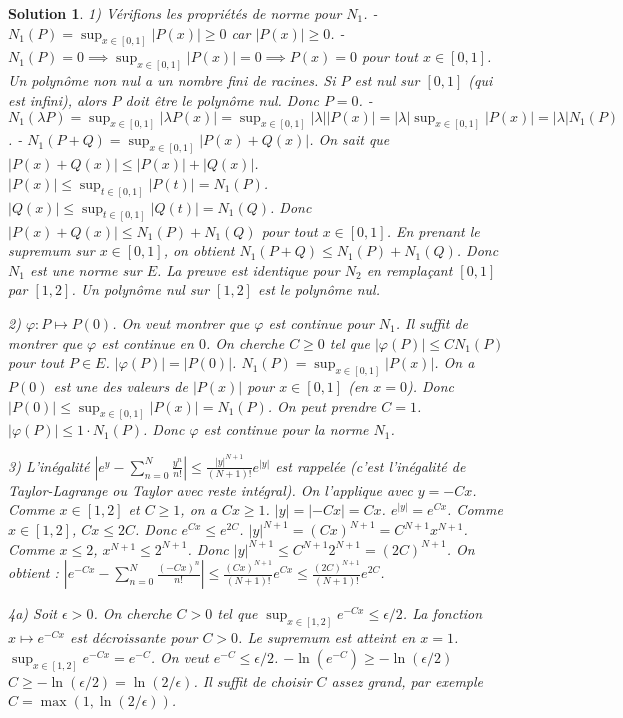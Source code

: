 \documentclass{article}
\newtheorem{solution}{Solution}
\begin{document}
\begin{solution}
1) Vérifions les propriétés de norme pour $N_1$.
- $N_1(P) = \sup_{x \in [0,1]} |P(x)| \ge 0$ car $|P(x)| \ge 0$.
- $N_1(P) = 0 \implies \sup_{x \in [0,1]} |P(x)| = 0 \implies P(x) = 0$ pour tout $x \in [0,1]$. Un polynôme non nul a un nombre fini de racines. Si $P$ est nul sur $[0,1]$ (qui est infini), alors $P$ doit être le polynôme nul. Donc $P=0$.
- $N_1(\lambda P) = \sup_{x \in [0,1]} |\lambda P(x)| = \sup_{x \in [0,1]} |\lambda| |P(x)| = |\lambda| \sup_{x \in [0,1]} |P(x)| = |\lambda| N_1(P)$.
- $N_1(P+Q) = \sup_{x \in [0,1]} |P(x)+Q(x)|$. On sait que $|P(x)+Q(x)| \le |P(x)| + |Q(x)|$.
$|P(x)| \le \sup_{t \in [0,1]} |P(t)| = N_1(P)$.
$|Q(x)| \le \sup_{t \in [0,1]} |Q(t)| = N_1(Q)$.
Donc $|P(x)+Q(x)| \le N_1(P) + N_1(Q)$ pour tout $x \in [0,1]$.
En prenant le supremum sur $x \in [0,1]$, on obtient $N_1(P+Q) \le N_1(P) + N_1(Q)$.
Donc $N_1$ est une norme sur $E$.
La preuve est identique pour $N_2$ en remplaçant $[0,1]$ par $[1,2]$. Un polynôme nul sur $[1,2]$ est le polynôme nul.

2) $\varphi: P \mapsto P(0)$. On veut montrer que $\varphi$ est continue pour $N_1$.
Il suffit de montrer que $\varphi$ est continue en $0$. On cherche $C \ge 0$ tel que $|\varphi(P)| \le C N_1(P)$ pour tout $P \in E$.
$|\varphi(P)| = |P(0)|$.
$N_1(P) = \sup_{x \in [0,1]} |P(x)|$.
On a $P(0)$ est une des valeurs de $|P(x)|$ pour $x \in [0,1]$ (en $x=0$).
Donc $|P(0)| \le \sup_{x \in [0,1]} |P(x)| = N_1(P)$.
On peut prendre $C=1$. $|\varphi(P)| \le 1 \cdot N_1(P)$.
Donc $\varphi$ est continue pour la norme $N_1$.

3) L'inégalité $|e^y - \sum_{n=0}^N \frac{y^n}{n!}| \le \frac{|y|^{N+1}}{(N+1)!} e^{|y|}$ est rappelée (c'est l'inégalité de Taylor-Lagrange ou Taylor avec reste intégral).
On l'applique avec $y = -Cx$. Comme $x \in [1,2]$ et $C \ge 1$, on a $Cx \ge 1$.
$|y| = |-Cx| = C x$.
$e^{|y|} = e^{Cx}$.
Comme $x \in [1,2]$, $Cx \le 2C$. Donc $e^{Cx} \le e^{2C}$.
$|y|^{N+1} = (Cx)^{N+1} = C^{N+1} x^{N+1}$. Comme $x \le 2$, $x^{N+1} \le 2^{N+1}$.
Donc $|y|^{N+1} \le C^{N+1} 2^{N+1} = (2C)^{N+1}$.
On obtient :
$|e^{-Cx} - \sum_{n=0}^N \frac{(-Cx)^n}{n!}| \le \frac{(Cx)^{N+1}}{(N+1)!} e^{Cx} \le \frac{(2C)^{N+1}}{(N+1)!} e^{2C}$.

4a) Soit $\epsilon > 0$. On cherche $C>0$ tel que $\sup_{x \in [1,2]} e^{-Cx} \le \epsilon/2$.
La fonction $x \mapsto e^{-Cx}$ est décroissante pour $C>0$.
Le supremum est atteint en $x=1$. $\sup_{x \in [1,2]} e^{-Cx} = e^{-C}$.
On veut $e^{-C} \le \epsilon/2$.
$-\ln(e^{-C}) \ge -\ln(\epsilon/2)$
$C \ge -\ln(\epsilon/2) = \ln(2/\epsilon)$.
Il suffit de choisir $C$ assez grand, par exemple $C = \max(1, \ln(2/\epsilon))$.


\end{solution}
\end{document}
